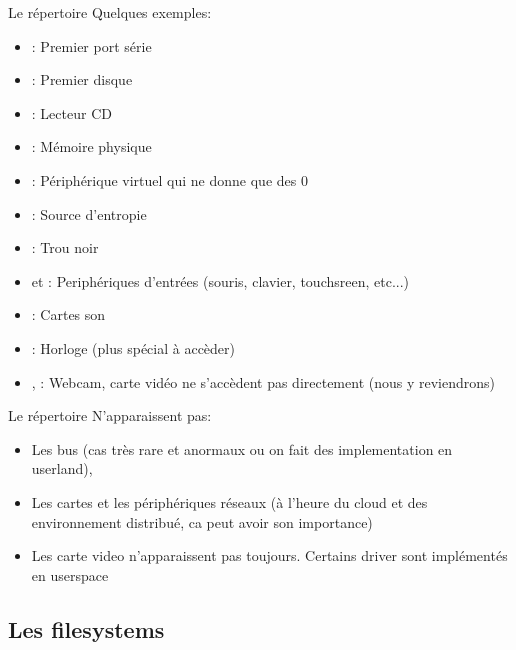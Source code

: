\begin{frame}[fragile=singleslide]{Le répertoire }
  Quelques exemples:
  \begin{itemize}
  \item {}: Premier port série
  \item {}: Premier disque
  \item {}: Lecteur CD
  \item {}: Mémoire physique
  \item {}: Périphérique virtuel qui ne donne que des 0
  \item {}: Source d'entropie
  \item {}: Trou noir
  \item {}  et : Periphériques d'entrées
    (souris, clavier, touchsreen, etc...)
  \item {}: Cartes son
  \item {}: Horloge (plus spécial à accèder)
  \item  {}, :  Webcam,  carte vidéo  ne
    s'accèdent pas directement (nous y reviendrons)
  \end{itemize}
\end{frame}

\begin{frame}[fragile=singleslide]{Le répertoire }
  N'apparaissent pas:
  \begin{itemize}
  \item Les bus (cas très rare et anormaux ou on fait des implementation
    en userland),
  \item Les cartes  et les périphériques réseaux (à  l'heure du cloud et
    des environnement distribué, ca peut avoir son importance)
  \item  Les carte  video n'apparaissent  pas toujours.  Certains driver
    sont implémentés en userspace
  \end{itemize}
\end{frame}


\subsection{Les filesystems}

